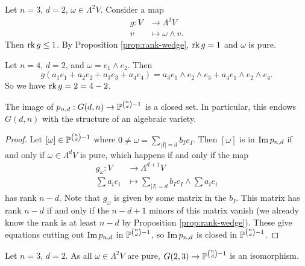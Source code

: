\begin{example}
  Let $n = 3$, $d = 2$, $\omega \in \Lambda^2 V$.
  Consider a map
  \begin{align*}
    g : V &\longrightarrow \Lambda^3 V \\
    v &\longmapsto \omega \wedge v.
  \end{align*}
  Then $\operatorname{rk} g \le 1$. By Proposition
  \ref{prop:rank-wedge}, $\operatorname{rk} g = 1$ and
  $\omega$ is pure.
\end{example}

\begin{example}
  Let $n = 4$, $d = 2$, and
  $\omega = e_1 \wedge e_2$. Then
  \[
    g(a_1 e_1 + a_2 e_2 + a_3 e_3 + a_4 e_4)
    = a_3 e_1 \wedge e_2 \wedge e_3
    + a_4 e_1 \wedge e_2 \wedge e_4.
  \]
  So we have $\operatorname{rk} g = 2 = 4 - 2$.
\end{example}

\begin{corollary}\label{cor:plucker-closed}
  The image of
  $p_{n, d} : G(d, n) \to \mathbb{P}^{\binom{n}{d} - 1}$
  is a closed set. In particular, this
  endows $G(d, n)$ with the structure of
  an algebraic variety.
\end{corollary}

\begin{proof}
  Let $[\omega] \in \mathbb{P}^{\binom{n}{d} - 1}$
  where $0 \ne \omega = \sum_{|I| = d} b_I e_I$.
  Then $[\omega]$ is in $\operatorname{Im} p_{n, d}$
  if and only if $\omega \in \Lambda^d V$
  is pure, which happens if and only if
  the map
  \begin{align*}
    g_\omega : V &\longrightarrow \Lambda^{d + 1} V \\
    \sum a_i e_i &\longmapsto \sum_{|I| = d} b_I e_I \wedge \sum a_i e_i
  \end{align*}
  has rank $n - d$. Note that $g_\omega$
  is given by some matrix in the $b_I$.
  This matrix has rank $n - d$ if and only
  if the $n - d + 1$ minors of this matrix
  vanish (we already know the rank
  is at least $n - d$ by Proposition
  \ref{prop:rank-wedge}).
  These give equations cutting out
  $\operatorname{Im} p_{n, d}$ in $\mathbb{P}^{\binom{n}{d} - 1}$,
  so $\operatorname{Im} p_{n, d}$ is closed in
  $\mathbb{P}^{\binom{n}{d} - 1}$.
\end{proof}

\begin{example}
  Let $n = 3$, $d = 2$. As all
  $\omega \in \Lambda^2 V$ are pure,
  $G(2, 3) \to \mathbb{P}^{\binom{n}{d} - 1}$
  is an isomorphism.
\end{example}

